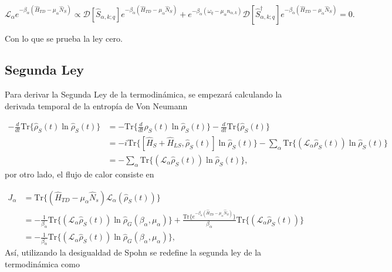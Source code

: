 \begin{appendixs}
\begin{equation*}
    \mathcal{L}_{\alpha}e^{-\beta_{\alpha}(\hat{H}_{TD} - \mu_{\alpha}\hat{N}_{S})} \propto  \mathcal{D}[\hat{S}_{\alpha,k;q}]e^{-\beta_{\alpha}(\hat{H}_{TD} - \mu_{\alpha}\hat{N}_{S})} + e^{-\beta_{\alpha}(\omega_{q} - \mu_{\alpha}n_{\alpha,k})}\mathcal{D}[\hat{S}^{\dagger}_{\alpha,k;q}]e^{-\beta_{\alpha}(\hat{H}_{TD} - \mu_{\alpha}\hat{N}_{S})} = 0.
\end{equation*}

Con lo que se prueba la ley cero.

\newpage


\subsection{Segunda Ley}
Para derivar la Segunda Ley de la termodinámica, se empezará calculando la derivada temporal de la entropía de Von Neumann

\begin{align*}
    - \frac{d}{dt}\text{Tr}\{ \hat{\rho}_{S}(t)\ln \hat{\rho}_{S}(t) \} & =  -\text{Tr}\Big\{ \frac{d}{dt}\hat{\rho}_{S}(t)\ln \hat{\rho}_{S}(t) \Big\} - \frac{d}{dt}\text{Tr}\{\hat{\rho}_{S}(t) \}\\
  & = - i \text{Tr}\{[\hat{H}_{S}+\hat{H}_{LS},\hat{\rho}_{S}(t)]\ln \hat{\rho}_{S}(t)  \} - \sum_{\alpha} \text{Tr}\{(\mathcal{L}_{\alpha}\hat{\rho}_{S}(t)) \ln \hat{\rho}_{S}(t) \}  \\
  & = -\sum_{\alpha}\text{Tr}\{(\mathcal{L}_{\alpha}\hat{\rho}_{S}(t)) \ln \hat{\rho}_{S}(t) \},
\end{align*}
por otro lado, el flujo de calor consiste en 

\begin{align*}
    J_{\alpha} & = \text{Tr}\{ (\hat{H}_{TD} - \mu_{\alpha}\hat{N}_{s})\mathcal{L}_{\alpha}(\hat{\rho}_{S}(t)) \} \\
    & = -\frac{1}{\beta_{\alpha}} \text{Tr}\{(\mathcal{L}_{\alpha}\hat{\rho}_{S}(t)) \ln \hat{\rho}_{G}(\beta_{\alpha},\mu_{\alpha})  \} + \frac{\text{Tr}\{e^{-\beta_{\alpha}(\hat{H}_{TD} - \mu_{\alpha}\hat{N}_{S})} \} }{\beta_{\alpha}} \text{Tr}\{(\mathcal{L}_{\alpha}\hat{\rho}_{S}(t)) \} \\
    & = -\frac{1}{\beta_{\alpha}} \text{Tr}\{(\mathcal{L}_{\alpha}\hat{\rho}_{S}(t))\ln \hat{\rho}_{G}(\beta_{\alpha},\mu_{\alpha})  \},
\end{align*}
Así, utilizando la desigualdad de Spohn se redefine la segunda ley de la termodinámica como


\end{appendixs}
